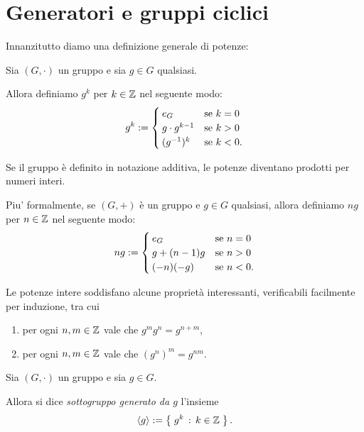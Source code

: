 \section{Generatori e gruppi ciclici}

Innanzitutto diamo una definizione generale di potenze:
\begin{definition} \label{def:potenze_intere}
    Sia $(G, \cdot)$ un gruppo e sia $g \in G$ qualsiasi. 
    
    Allora definiamo $g^k$ per $k \in \mathbb{Z}$ nel seguente modo: \[
        g^k := \begin{cases}
            e_G &\text{se } k = 0\\
            g \cdot g^{k-1} &\text{se } k > 0\\
            (g^{-1})^k &\text{se } k < 0.
        \end{cases}    
    \]
\end{definition}

Se il gruppo è definito in notazione additiva, le potenze diventano prodotti per numeri interi. 

Piu' formalmente, se $(G, +)$ è un gruppo e $g \in G$ qualsiasi, allora definiamo $ng$ per $n \in \mathbb{Z}$ nel seguente modo: \[
    ng := \begin{cases}
        e_G &\text{se } n = 0\\
        g + (n-1)g &\text{se } n > 0\\
        (-n)(-g) &\text{se } n < 0.
    \end{cases}   
\]

Le potenze intere soddisfano alcune proprietà interessanti, verificabili facilmente per induzione, tra cui \begin{enumerate}[label={(P\arabic*)}, ref={(P\arabic*)}]
    \item per ogni $n, m \in \mathbb{Z}$ vale che $g^mg^n = g^{n+m}$,
    \item per ogni $n, m \in \mathbb{Z}$ vale che ${(g^n)}^m = g^{nm}$.
\end{enumerate}

\begin{definition}
     \label{def:sgr_generato}
    Sia $(G, \cdot)$ un gruppo e sia $g \in G$.

    Allora si dice \emph{sottogruppo generato da $g$} l'insieme \[
        \langle g\rangle := \left\{\;g^k \,:\, k \in \mathbb{Z}\;\right\}.    
    \]
\end{definition}

